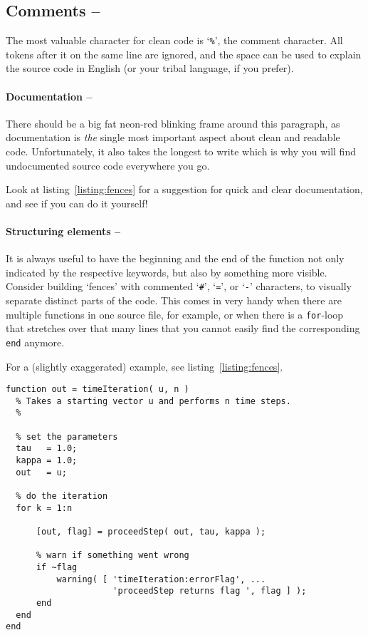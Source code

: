 \subsection{Comments  -- \cleansymbol\cleansymbol\cleansymbol\cleansymbol\cleansymbol}

The most valuable character for clean \matlab{} code is `\lstinline!%!',
the comment character. All tokens after it on the same line are ignored, and
the space can be used to explain the source code in English (or your tribal
language, if you prefer).

\paragraph{Documentation -- \cleansymbol\cleansymbol\cleansymbol\cleansymbol\cleansymbol}
There should be a big fat neon-red blinking frame around this paragraph, as
documentation is \emph{the} single most important aspect about clean and
readable code. Unfortunately, it also takes the longest to write which is why
you will find undocumented source code everywhere you go.

Look at listing~\ref{listing:fences} for a suggestion for quick and clear
documentation, and see if you can do it yourself!


\paragraph{Structuring elements -- \cleansymbol\cleansymbol\cleansymbol}
It is always useful to have the beginning and the end of the function not only
indicated by the respective keywords, but also by something more visible.
Consider building `fences' with commented `\lstinline!#!', `\lstinline!=!', or
`\lstinline!-!' characters, to visually separate distinct parts of the code.
This comes in very handy when there are multiple functions in one source file,
for example, or when there is a \lstinline!for!-loop that stretches over that
many lines that you cannot easily find the corresponding \lstinline!end!
anymore.

For a (slightly exaggerated) example, see listing~\ref{listing:fences}.

\begin{lstlisting}[float,label={listing:fences},caption={Function in which `\lstinline!-!'-fences are used to emphasize the functionally separate sections of the code.}]
function out = timeIteration( u, n )
  % Takes a starting vector u and performs n time steps.
  %

  % set the parameters
  tau   = 1.0;
  kappa = 1.0;
  out   = u;

  % do the iteration
  for k = 1:n

      [out, flag] = proceedStep( out, tau, kappa );

      % warn if something went wrong
      if ~flag
          warning( [ 'timeIteration:errorFlag', ...
                     'proceedStep returns flag ', flag ] );
      end
  end
end
\end{lstlisting}


